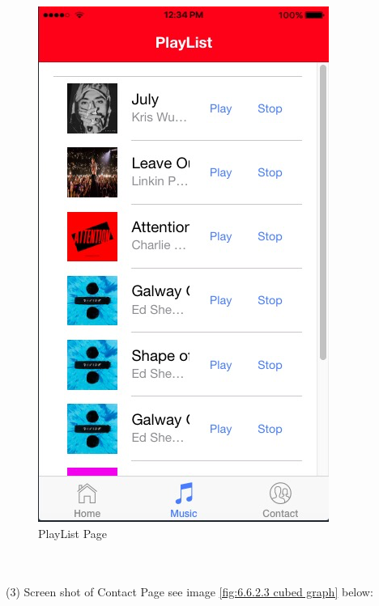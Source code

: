 \begin{figure}[h]
	\centering
	\includegraphics[scale=0.5]{img/PlayList.png}
	\caption{PlayList Page}
	\label{fig:6.6.2.2 cubed graph}
\end{figure}
\\ \\
(3) Screen shot of Contact Page see image \ref{fig:6.6.2.3 cubed graph} below:
